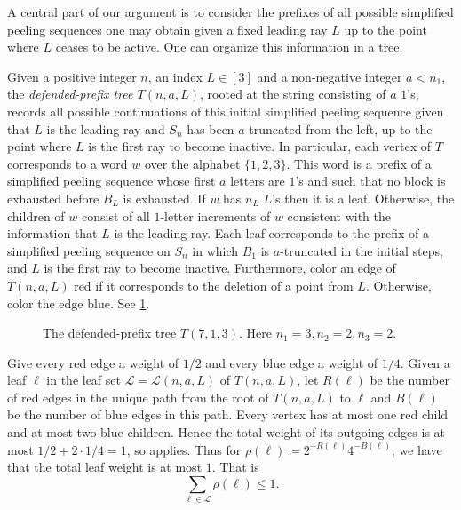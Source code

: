 \documentclass[11pt]{amsart}
\theoremstyle{definition}
\begin{document}
A central part of our argument is to  
consider the prefixes of all 
possible simplified peeling sequences 
one may obtain given a fixed leading ray $L$ 
up to the point where $L$ ceases to be active. One can organize this information in a tree. 
\par 
Given a positive integer $n$, an index $L\in [3]$ and a non-negative integer $a<n_1$, the \emph{defended-prefix tree $T(n,a,L)$}, rooted at the string consisting 
of $a$ $1$'s,  
records all possible continuations 
of this initial simplified peeling sequence 
given that $L$ is the leading ray and $S_n$ has 
been $a$-truncated from the left, up to the 
point where $L$ is the first ray to become inactive. 
In particular, each vertex of $T$ 
corresponds to a 
word $w$ over the alphabet $\{1,2,3\}$. 
This word is a prefix of a 
simplified peeling sequence 
whose first $a$ letters are $1$'s and 
such that no block is exhausted before $B_{L}$ is exhausted. If $w$ has $n_{L}$ $L$'s then 
it is a leaf. Otherwise, 
the children of $w$ consist of all $1$-letter increments of $w$ consistent with the information that $L$ is the leading ray. Each leaf corresponds to the prefix of a simplified 
peeling sequence on $S_n$ in which $B_1$ is $a$-truncated in the initial steps, and $L$ is the first ray to become 
inactive. 
Furthermore, color an edge of $T(n,a,L)$ 
red if it corresponds to the deletion of a point from 
$L$. Otherwise, color the edge blue. See \cref{fig:T713}.
\par 
\begin{figure}[h]
   \caption{The defended-prefix tree $T(7,1,3)$. Here $n_1=3, n_2=2,n_3=2$.}
   \label{fig:T713}
\end{figure}
\par 
Give every red edge a weight of $1/2$ and every blue 
edge a weight of $1/4$. Given a leaf 
$\ell$ in the leaf set $\mathcal{L}=\mathcal{L}(n,a,L)$ of $T(n,a,L)$, 
let $R(\ell)$ be the number of 
red edges in the unique path from the root of $T(n,a,L)$ 
to $\ell$ and $B(\ell)$ be the number of blue edges in this path. Every vertex has at most one red child and at most two blue children. Hence the total weight of its outgoing edges is at most $1/2 + 2\cdot 1/4= 1$, so  applies. Thus for $\rho(\ell) \coloneqq 2^{-R(\ell)}4^{-B(\ell)}$, we have that the total leaf weight is at most $1$. That is
\begin{equation}\label{eqn:weighting}
    \sum_{\ell \in \mathcal{L}} \rho(\ell) \leq 1. 
\end{equation}
\end{document}
